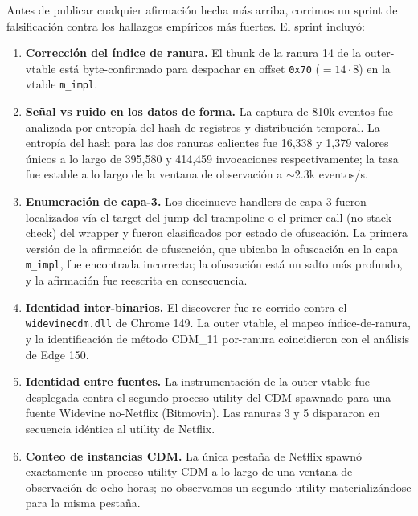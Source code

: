 \documentclass[11pt,letterpaper]{article}
\begin{document}
Antes de publicar cualquier afirmación hecha más arriba,
corrimos un sprint de falsificación contra los hallazgos
empíricos más fuertes. El sprint incluyó:

\begin{enumerate}[itemsep=2pt,topsep=2pt]
  \item \textbf{Corrección del índice de ranura.} El thunk de la
        ranura 14 de la outer-vtable está byte-confirmado para
        despachar en offset \texttt{0x70} ($= 14 \cdot 8$) en la
        vtable \texttt{m\_impl}.
  \item \textbf{Señal vs ruido en los datos de forma.} La captura
        de 810k eventos fue analizada por entropía del hash de
        registros y distribución temporal. La entropía del hash
        para las dos ranuras calientes fue 16{,}338 y 1{,}379
        valores únicos a lo largo de 395{,}580 y 414{,}459
        invocaciones respectivamente; la tasa fue estable a lo
        largo de la ventana de observación a $\sim$2.3k
        eventos/s.
  \item \textbf{Enumeración de capa-3.} Los diecinueve handlers
        de capa-3 fueron localizados vía el target del jump del
        trampoline o el primer call (no-stack-check) del wrapper
        y fueron clasificados por estado de ofuscación. La
        primera versión de la afirmación de ofuscación, que
        ubicaba la ofuscación en la capa \texttt{m\_impl}, fue
        encontrada incorrecta; la ofuscación está un salto más
        profundo, y la afirmación fue reescrita en consecuencia.
  \item \textbf{Identidad inter-binarios.} El discoverer fue
        re-corrido contra el \texttt{widevinecdm.dll} de Chrome
        149. La outer vtable, el mapeo índice-de-ranura, y la
        identificación de método CDM\_11 por-ranura coincidieron
        con el análisis de Edge 150.
  \item \textbf{Identidad entre fuentes.} La instrumentación de
        la outer-vtable fue desplegada contra el segundo proceso
        utility del CDM spawnado para una fuente Widevine
        no-Netflix (Bitmovin). Las ranuras 3 y 5 dispararon en
        secuencia idéntica al utility de Netflix.
  \item \textbf{Conteo de instancias CDM.} La única pestaña de
        Netflix spawnó exactamente un proceso utility CDM a lo
        largo de una ventana de observación de ocho horas; no
        observamos un segundo utility materializándose para la
        misma pestaña.
\end{enumerate}
\end{document}
